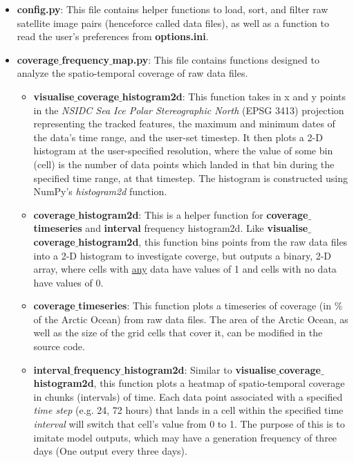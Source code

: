 \documentclass{article}
\begin{document}
        \begin{itemize}
            \item \textbf{config.py}: This file contains helper functions to load, sort, and filter raw satellite image pairs (henceforce called data files), as well as a function to read the user's preferences from \textbf{options.ini}.
            \item \textbf{coverage$\_$frequency$\_$map.py}: This file contains functions designed to analyze the spatio-temporal coverage of raw data files.
            \begin{itemize}
                \item \textbf{visualise$\_$coverage$\_$histogram2d}: This function takes in x and y points in the \textit{NSIDC Sea Ice Polar Stereographic North} (EPSG 3413) projection representing the tracked features, the maximum and minimum dates of the data's time range, and the user-set timestep. It then plots a 2-D histogram at the user-specified resolution, where the value of some bin (cell) is the number of data points which landed in that bin during the specified time range, at that timestep. The histogram is constructed using NumPy's \textit{histogram2d} function.
                \item \textbf{coverage$\_$histogram2d}: This is a helper function for \textbf{coverage$\_$timeseries} and \textbf{interval} frequency histogram2d. Like \textbf{visualise$\_$coverage$\_$histogram2d}, this function bins points from the raw data files into a 2-D histogram to investigate coverge, but outputs a binary, 2-D array, where cells with \underline{any} data have values of 1 and cells with no data have values of 0.
                \item \textbf{coverage$\_$timeseries}: This function plots a timeseries of coverage (in $\%$ of the Arctic Ocean) from raw data files. The area of the Arctic Ocean, as well as the size of the grid cells that cover it, can be modified in the source code.
                \item \textbf{interval$\_$frequency$\_$histogram2d}: Similar to \textbf{visualise$\_$coverage$\_$histogram2d}, this function plots a heatmap of spatio-temporal coverage in chunks (intervals) of time. Each data point associated with a specified \textit{time step} (e.g. 24, 72 hours) that lands in a cell within the specified time \textit{interval} will switch that cell's value from 0 to 1. The purpose of this is to imitate model outputs, which may have a generation frequency of three days (One output every three days).
            \end{itemize}

\end{itemize}
\end{document}
